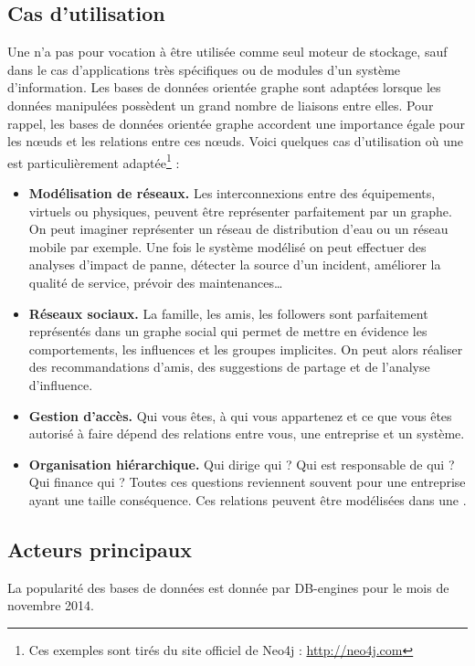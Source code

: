 \subsection{Cas d'utilisation}
	Une \bddGraphe{} n'a pas pour vocation à être utilisée comme seul moteur de stockage, sauf dans le cas d'applications très spécifiques ou de modules d'un système d'information. Les bases de données orientée graphe sont adaptées lorsque les données manipulées possèdent un grand nombre de liaisons entre elles. Pour rappel, les bases de données orientée graphe accordent une importance égale pour les nœuds et les relations entre ces nœuds. Voici quelques cas d'utilisation où une \bddGraphe{} est particulièrement adaptée\footnote{Ces exemples sont tirés du site officiel de Neo4j : \url{http://neo4j.com}} :

	\begin{itemize}
	 	\item \textbf{Modélisation de réseaux.} Les interconnexions entre des équipements, virtuels ou physiques, peuvent être représenter parfaitement par un graphe. On peut imaginer représenter un réseau de distribution d'eau ou un réseau mobile par exemple. Une fois le système modélisé on peut effectuer des analyses d'impact de panne, détecter la source d'un incident, améliorer la qualité de service, prévoir des maintenances\dots
	 	\item \textbf{Réseaux sociaux.} La famille, les amis, les followers sont parfaitement représentés dans un graphe social qui permet de mettre en évidence les comportements, les influences et les groupes implicites. On peut alors réaliser des recommandations d'amis, des suggestions de partage et de l'analyse d'influence.
	 	\item \textbf{Gestion d'accès.} Qui vous êtes, à qui vous appartenez et ce que vous êtes autorisé à faire dépend des relations entre vous, une entreprise et un système.
	 	\item \textbf{Organisation hiérarchique.} Qui dirige qui ? Qui est responsable de qui ? Qui finance qui ? Toutes ces questions reviennent souvent pour une entreprise ayant une taille conséquence. Ces relations peuvent être modélisées dans une \bddGraphe{}.
	 \end{itemize} 

\subsection{Acteurs principaux}
	La popularité des bases de données est donnée par DB-engines\cite{db_engines_key_value} pour le mois de novembre 2014.

